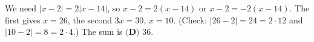 We need $|x-2|=2|x-14|$, so $x-2=2(x-14)$ or $x-2=-2(x-14)$. The first gives $x=26$, the second $3x=30$, $x=10$. (Check: $|26-2|=24=2\cdot12$ and $|10-2|=8=2\cdot4$.) The sum is $\boxed{\textbf{(D) }36}$.
